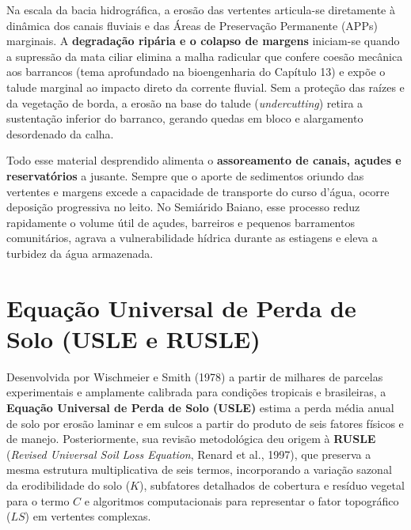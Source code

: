 Na escala da bacia hidrográfica, a erosão das vertentes articula-se diretamente à dinâmica dos canais fluviais e das Áreas de Preservação Permanente (APPs) marginais. A \textbf{degradação ripária e o colapso de margens} iniciam-se quando a supressão da mata ciliar elimina a malha radicular que confere coesão mecânica aos barrancos (tema aprofundado na bioengenharia do Capítulo 13) e expõe o talude marginal ao impacto direto da corrente fluvial. Sem a proteção das raízes e da vegetação de borda, a erosão na base do talude (\textit{undercutting}) retira a sustentação inferior do barranco, gerando quedas em bloco e alargamento desordenado da calha.

Todo esse material desprendido alimenta o \textbf{assoreamento de canais, açudes e reservatórios} a jusante. Sempre que o aporte de sedimentos oriundo das vertentes e margens excede a capacidade de transporte do curso d'água, ocorre deposição progressiva no leito. No Semiárido Baiano, esse processo reduz rapidamente o volume útil de açudes, barreiros e pequenos barramentos comunitários, agrava a vulnerabilidade hídrica durante as estiagens e eleva a turbidez da água armazenada.

\section{Equação Universal de Perda de Solo (USLE e RUSLE)}

Desenvolvida por Wischmeier e Smith (1978) a partir de milhares de parcelas experimentais e amplamente calibrada para condições tropicais e brasileiras, a \textbf{Equação Universal de Perda de Solo (USLE)} estima a perda média anual de solo por erosão laminar e em sulcos a partir do produto de seis fatores físicos e de manejo. Posteriormente, sua revisão metodológica deu origem à \textbf{RUSLE} (\textit{Revised Universal Soil Loss Equation}, Renard et al., 1997), que preserva a mesma estrutura multiplicativa de seis termos, incorporando a variação sazonal da erodibilidade do solo ($K$), subfatores detalhados de cobertura e resíduo vegetal para o termo $C$ e algoritmos computacionais para representar o fator topográfico ($LS$) em vertentes complexas.

